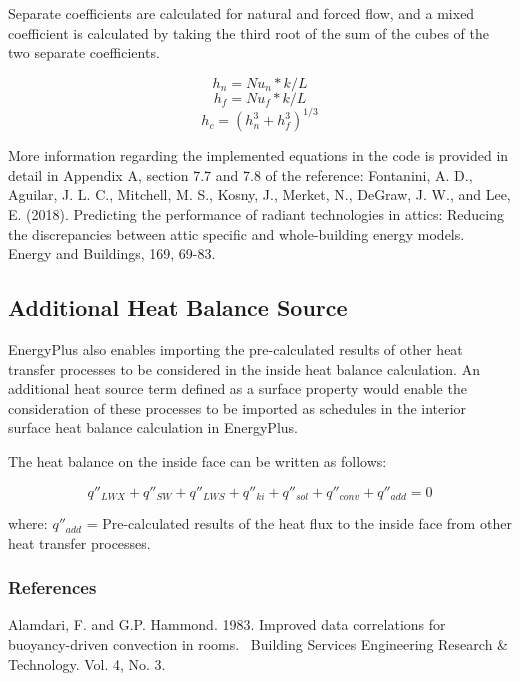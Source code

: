 Separate coefficients are calculated for natural and forced flow, and a mixed coefficient is calculated by taking the third root of the sum of the cubes of the two separate coefficients.

\begin{equation}
h_n = Nu_n * k / L
\end{equation}
\begin{equation}
h_f = Nu_f * k / L
\end{equation}
\begin{equation}
h_c = {(h_n^3 + h_f^3)}^{1/3}
\end{equation}

More information regarding the implemented equations in the code is provided in detail in Appendix A, section 7.7 and 7.8 of the reference: Fontanini, A. D., Aguilar, J. L. C., Mitchell, M. S., Kosny, J., Merket, N., DeGraw, J. W., and Lee, E. (2018). Predicting the performance of radiant technologies in attics: Reducing the discrepancies between attic specific and whole-building energy models. Energy and Buildings, 169, 69-83.

\subsection{Additional Heat Balance Source}\label{additional-heat-balance-source}

EnergyPlus also enables importing the pre-calculated results of other heat transfer processes to be considered in the inside heat balance calculation. An additional heat source term defined as a surface property would enable the consideration of these processes to be imported as schedules in the interior surface heat balance calculation in EnergyPlus.

The heat balance on the inside face can be written as follows:

\begin{equation}
{q''_{LWX}} + {q''_{SW}} + {q''_{LWS}} + {q''_{ki}} + {q''_{sol}} + {q''_{conv}} + {q''_{add}} = 0
\end{equation}

where:
\(q''_{add}\) = Pre-calculated results of the heat flux to the inside face from other heat transfer processes.

\subsubsection{References}\label{references-032}

Alamdari, F. and G.P. Hammond. 1983. Improved data correlations for buoyancy-driven convection in rooms.~ Building Services Engineering Research \& Technology. Vol. 4, No. 3.

